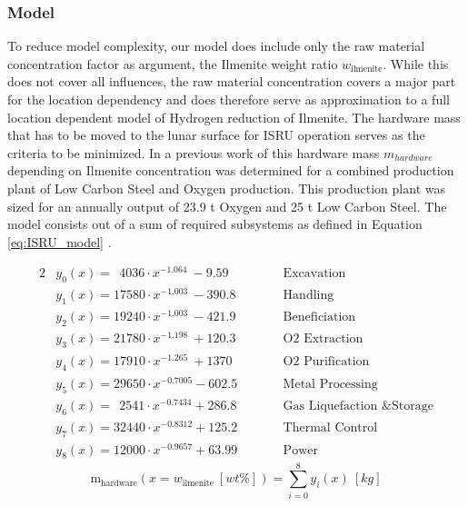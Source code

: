 \documentclass[utf8]{FrontiersinHarvard} %
\begin{document}
\subsubsection{Model}
\label{sec:model}
To reduce model complexity, our model does include only the raw material concentration factor as argument, the Ilmenite weight ratio $w_{\mathrm{ilmenite}}$.
While this does not cover all influences, the raw material concentration covers a major part for the location dependency and does therefore serve as approximation to a full location dependent model of Hydrogen reduction of Ilmenite.
The hardware mass that has to be moved to the lunar surface for ISRU operation serves as the criteria to be minimized. In a previous work of \citep{GuerreroGonzalez2023} this hardware mass $m_{hardware}$ depending on Ilmenite concentration was determined for a combined production plant of Low Carbon Steel and Oxygen production. This production plant was sized for an annually output of 23.9 t Oxygen and 25 t Low Carbon Steel. The model consists out of a sum of required subsystems as defined in Equation \ref{eq:ISRU_model} \citep{GuerreroGonzalez2023}.

\begin{alignat*}{2}
    & y_{0}(x) =  \ \ 4036 \cdot x^{-1.064} \ -9.59   && \qquad \text{Excavation}                  \\
    & y_{1}(x) =  17580 \cdot x^{-1.003} \  -390.8    && \qquad \text{Handling}                    \\
    & y_{2}(x) =  19240 \cdot x^{-1.003} \  -421.9    && \qquad \text{Beneficiation}               \\
    & y_{3}(x) =  21780 \cdot x^{-1.198} \  +120.3    && \qquad \text{O2 Extraction}               \\
    & y_{4}(x) =  17910 \cdot x^{-1.265} \  +1370     && \qquad \text{O2 Purification}             \\
    & y_{5}(x) =  29650 \cdot x^{-0.7005} -602.5      && \qquad \text{Metal Processing}            \\
    & y_{6}(x) =  \ \ 2541 \cdot x^{-0.7434}  +286.8  && \qquad \text{Gas Liquefaction \& Storage}  \\ 
    & y_{7}(x) =  32440 \cdot x^{-0.8312}  +125.2     && \qquad \text{Thermal Control}             \\
    & y_{8}(x) =  12000 \cdot x^{-0.9657}  +63.99     && \qquad \text{Power}
\end{alignat*}
\begin{equation}
\displaystyle \mathrm{m_{hardware}}(x=w_{\mathrm{ilmenite}} \ [wt\%]) = \sum\limits_{i=0}^8 y_{i}(x) \ [kg]
\label{eq:ISRU_model}
\end{equation}
\end{document}
